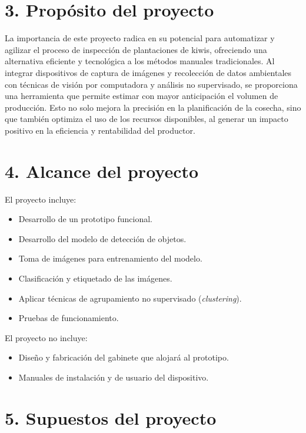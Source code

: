 \documentclass[
11pt, %
]{charter}
\begin{document}
\section{3. Propósito del proyecto}
\label{sec:proposito}

La importancia de este proyecto radica en su potencial para automatizar y agilizar el proceso de inspección de plantaciones de kiwis, ofreciendo una alternativa eficiente y tecnológica a los métodos manuales tradicionales. Al integrar dispositivos de captura de imágenes y recolección de datos ambientales con técnicas de visión por computadora y análisis no supervisado, se proporciona una herramienta  que permite estimar con mayor anticipación el volumen de producción. Esto no solo mejora la precisión en la planificación de la cosecha, sino que también optimiza el uso de los recursos disponibles, al generar un impacto positivo en la eficiencia y rentabilidad del productor.

\section{4. Alcance del proyecto}
\label{sec:alcance}

El proyecto incluye:
\begin{itemize}
    \item Desarrollo de un prototipo funcional.
    \item Desarrollo del modelo de detección de objetos.
    \item Toma de imágenes para entrenamiento del modelo.
    \item Clasificación y etiquetado de las imágenes.
    \item Aplicar técnicas de agrupamiento no supervisado (\textit{clustering}).
    \item Pruebas de funcionamiento.
\end{itemize}

El proyecto no incluye:
\begin{itemize}
	
    \item Diseño y fabricación del gabinete que alojará al prototipo.
    \item Manuales de instalación y de usuario del dispositivo.
\end{itemize}


\section{5. Supuestos del proyecto}
\label{sec:supuestos}
\end{document}

